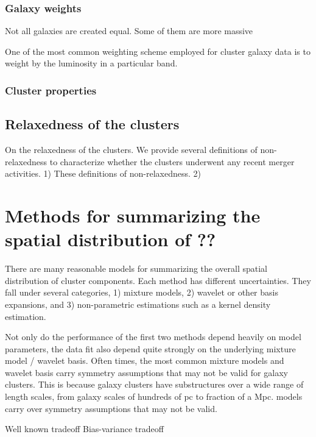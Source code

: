 \documentclass[usenatbib]{mn2e}
\begin{document}
\subsubsection{Galaxy weights}
Not all galaxies are created equal. Some of them are more massive 

One of the most common weighting scheme employed for cluster galaxy data is to weight
by the luminosity in a particular band.

\subsubsection{Cluster properties}
\subsection{Relaxedness of the clusters}
On the relaxedness of the clusters.
We provide several definitions of non-relaxedness to characterize whether
the clusters underwent any recent merger activities. 
1) These definitions of non-relaxedness.
2) 


\section{Methods for summarizing the spatial distribution of ??}
There are many reasonable models for summarizing the overall spatial
distribution of cluster components. Each method has different uncertainties.
They fall under several categories, 1) mixture models, 2) wavelet or other
basis expansions, and 3) non-parametric estimations such as a kernel density estimation. 

Not only do the performance of the first two methods depend heavily on model parameters, 
the data fit also depend quite strongly on the underlying mixture model /
wavelet basis. Often times, the most common mixture models and wavelet basis carry symmetry
assumptions that may not be valid for galaxy clusters. 
This is because galaxy clusters have substructures over a wide range of length
scales, from galaxy scales of hundreds of pc to fraction of a Mpc. 
models carry over symmetry assumptions that may not be valid.

Well known tradeoff Bias-variance tradeoff
\end{document}
